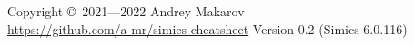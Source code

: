 \documentclass[8pt]{extarticle}
\begin{document}
\begin{multicols*}{3}
\begin{itemize}[left=1.5em]
        \begin{minipage}[t]{\linewidth}
        \end{minipage}
\end{itemize}

Copyright \copyright\ 2021—2022 Andrey Makarov \\
\href{https://github.com/a-mr/simics-cheatsheet}{https://github.com/a-mr/simics-cheatsheet}
Version 0.2 (Simics 6.0.116)

\ifdefined\cheatsheetCompact
\end{multicols*}
\fi
\end{document}
